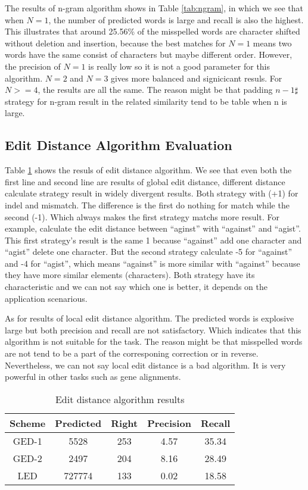 \documentclass[11pt]{article}
\begin{document}
The results of n-gram algorithm shows in Table \ref{tab:ngram}, in which we see that when $N=1$, the number of predicted words is large and recall is also the highest. This illustrates that around 25.56\% of the misspelled words are character shifted without deletion and insertion, because the best matches for $N=1$ means two words have the same consist of characters but maybe different order. However, the precision of $N=1$ is really low so it is not a good parameter for this algorithm. $N=2$ and $N=3$ gives more balanced and signicicant resuls. For $N>=4$, the results are all the same. The reason might be that padding $n-1 \sharp$ strategy for n-gram result in the related similarity tend to be table when n is large. 

\subsection{Edit Distance Algorithm Evaluation}

Table \ref{tab:editdis} shows the resuls of edit distance algorithm. We see that even both the first line and second line are results of global edit distance, different distance calculate strategy result in widely divergent results. Both strategy with (+1) for indel and mismatch. The difference is the first do nothing for match while the second (-1). Which always makes the first strategy matchs more result. For example, calculate the edit distance between ``aginst'' with ``against'' and ``agist''. This first strategy's result is the same 1 because ``against'' add one character and ``agist'' delete one character. But the second strategy calculate -5 for ``against'' and -4 for ``agist'', which means ``against'' is more similar with ``against'' because they have more similar elements (characters). Both strategy have its characteristic and we can not say which one is better, it depends on the application scenarious.

As for results of local edit distance algorithm. The predicted words is explosive large but both precision and recall are not satisfactory. Which indicates that this algorithm is not suitable for the task. The reason might be that misspelled words are not tend to be a part of the corresponing correction or in reverse. Nevertheless, we can not say local edit distance is a bad algorithm. It is very powerful in other tasks such as gene alignments.

\begin{table}
	\small
	\centering
	\begin{tabular}{c|c|c|c|c}
		\hline
		Scheme &Predicted & Right & Precision & Recall \\
		\hline
		 GED-1 & 5528 & 253 & 4.57 & 35.34 \\
		\hline
		GED-2 & 2497 & 204 & 8.16 & 28.49 \\
		\hline
		LED & 727774 & 133 & 0.02 & 18.58 \\
		\hline
	\end{tabular}
	\caption{Edit distance algorithm results}
	\label{tab:editdis}
\end{table}
\end{document}
